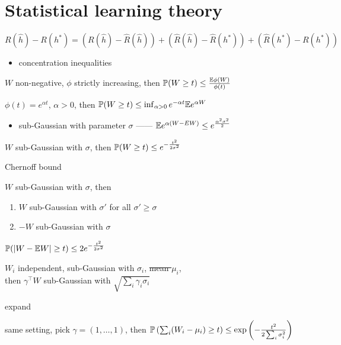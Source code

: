 \section{Statistical learning theory}\label{sec:statistical-learning-theory}

\begin{fact}
    $R(\hat h) - R(h^*) = \left( R(\hat h) - \hat R(\hat h) \right) + \left( \hat R (\hat h) - \hat R (h^*) \right) + \left( \hat R (h^*) - R(h^*) \right)$
\end{fact}

\begin{itemize}
    \item concentration inequalities
\end{itemize}

\begin{fact}
    $W$ non-negative, $\phi$ strictly increasing, then $\mathbb{P}(W \geq t) \leq \frac{\mathbb{E}\phi(W)}{\phi(t)}$
\end{fact}
\begin{fact}
    $\phi(t) = e^{\alpha t}$, $\alpha > 0$, then $\mathbb{P}(W \geq t) \leq \inf_{\alpha > 0} e^{-\alpha t}\mathbb{E} e^{\alpha W}$
\end{fact}
\begin{itemize}
    \item sub-Gaussian with parameter $\sigma$ ------ $\mathbb{E} e^{\alpha (W - EW)} \leq e^{\frac{\alpha^2 \sigma^2}{2}}$
\end{itemize}

\begin{prop}
    $W$ sub-Gaussian with $\sigma$, then $\mathbb{P}(W \geq t) \leq e^{-\frac{t^2}{2\sigma^2}}$
\end{prop}
\begin{pf}
    Chernoff bound
\end{pf}
\begin{fact}
    $W$ sub-Gaussian with $\sigma$, then
    \begin{enumerate}
        \item $W$ sub-Gaussian with $\sigma'$ for all $\sigma' \geq \sigma$
        \item $-W$ sub-Gaussian with $\sigma$
    \end{enumerate}
\end{fact}
\begin{fact}
    $\mathbb{P}(|W - \mathbb{E} W| \geq t) \leq 2 e^{-\frac{t^2}{2\sigma^2}}$
\end{fact}
\begin{prop}
    $W_i$ independent, sub-Gaussian with $\sigma_i$, \st{mean $\mu_i$},\\ then $\gamma^\top W$ sub-Gaussian with $\sqrt{\sum_i \gamma_i \sigma_i}$
\end{prop}
\begin{pf}
    expand
\end{pf}
\begin{fact}
    same setting, pick $\gamma = (1, \dots, 1)$, then $\mathbb{P}\left(\sum_i (W_i - \mu_i) \geq t\right) \leq \exp\left( - \frac{t^2}{2 \sum_i \sigma_i^2} \right)$
\end{fact}


